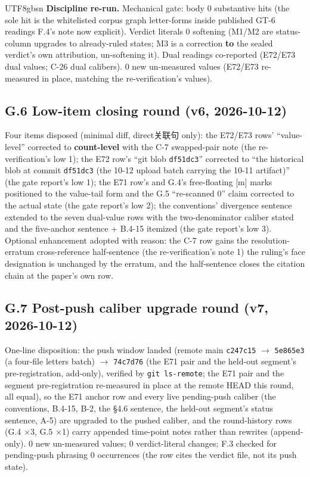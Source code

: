 \documentclass[11pt,letterpaper]{article}
\begin{document}
\begin{CJK}{UTF8}{gbsn}
\textbf{Discipline re-run.} Mechanical gate: body 0 substantive hits (the sole hit is the whitelisted corpus graph letter-forms inside published GT-6 readings \textemdash{} F.4's note now explicit). Verdict literals 0 softening (M1/M2 are status-column upgrades to already-ruled states; M3 is a correction \textbf{to} the sealed verdict's own attribution, un-softening it). Dual readings co-reported (E72/E73 dual values; C-26 dual calibers). 0 new un-measured values (E72/E73 re-measured in place, matching the re-verification's values).

\subsection*{G.6 Low-item closing round (v6, 2026-10-12)}

Four items disposed (minimal diff, direct关联句 only): the E72/E73 rows' ``value-level'' corrected to \textbf{count-level} with the C-7 swapped-pair note (the re-verification's low 1); the E72 row's ``git blob \texttt{df51dc3}'' corrected to ``the historical blob at commit \texttt{df51dc3} (the 10-12 upload batch carrying the 10-11 artifact)'' (the gate report's low 1); the E71 row's and G.4's free-floating [m] marks positioned to the value-tail form and the G.5 ``re-scanned 0'' claim corrected to the actual state (the gate report's low 2); the conventions' divergence sentence extended to the seven dual-value rows with the two-denominator caliber stated and the five-anchor sentence + B.4-15 itemized (the gate report's low 3). Optional enhancement adopted with reason: the C-7 row gains the resolution-erratum cross-reference half-sentence (the re-verification's note 1) \textemdash{} the ruling's face designation is unchanged by the erratum, and the half-sentence closes the citation chain at the paper's own row.

\subsection*{G.7 Post-push caliber upgrade round (v7, 2026-10-12)}

One-line disposition: the push window landed (remote main \texttt{c247c15} \ensuremath{\to} \texttt{5e865e3} (a four-file letters batch) \ensuremath{\to} \texttt{74c7d76} (the E71 pair and the held-out segment's pre-registration, add-only), verified by \texttt{git ls-remote}; the E71 pair and the segment pre-registration re-measured in place at the remote HEAD this round, all equal), so the E71 anchor row and every live pending-push caliber (the conventions, B.4-15, B-2, the \S{}4.6 sentence, the held-out segment's status sentence, A-5) are upgraded to the pushed caliber, and the round-history rows (G.4 \ensuremath{\times}3, G.5 \ensuremath{\times}1) carry appended time-point notes rather than rewrites (append-only). 0 new un-measured values; 0 verdict-literal changes; F.3 checked for pending-push phrasing \textemdash{} 0 occurrences (the row cites the verdict file, not its push state).


\end{CJK}
\end{document}
